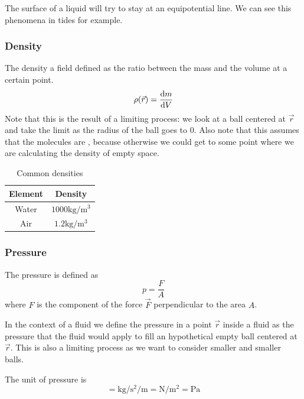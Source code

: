\documentclass[12pt]{extarticle}
\begin{document}
The surface of a liquid will try to stay at an equipotential line. We can see this phenomena in tides for example.

\subsubsection{Density}

The density a field defined as the ratio between the mass and the volume at a certain point.
\begin{equation}
    \rho(\vec r) = \dv{m}{V}
\end{equation}
Note that this is the result of a limiting process: we look at a ball centered at $\vec r$ and take the limit as the radius of the ball goes to $0$.
Also note that this assumes that the molecules are , because otherwise we could get to some point where we are calculating the density of empty space.

\begin{table}[H]
    \centering
    \begin{tabular}{|c|c|}
        \hline
        \textbf{Element} & \textbf{Density}                         \\
        \hline
        Water            & $1000 \si{\kilogram \per \meter \cubed}$ \\
        Air              & $1.2 \si{\kilogram \per \meter \cubed}$  \\
        \hline
    \end{tabular}
    \caption{Common densities}
\end{table}

\subsubsection{Pressure}

The pressure is defined as
\begin{equation}
    p = \frac{F}{A}
\end{equation}
where $F$ is the component of the force $\vec{F}$ perpendicular to the area $A$.

In the context of a fluid we define the pressure in a point $\vec r$ inside a fluid as the pressure that the fluid would apply to fill an hypothetical empty ball centered at $\vec r$.
This is also a limiting process as we want to consider smaller and smaller balls.

The unit of pressure is
\begin{equation}
    [p] = \si{\kilogram \per \second \squared \per \meter} = \si {\newton \per \meter \squared} = \si{\pascal}
\end{equation}
\end{document}
